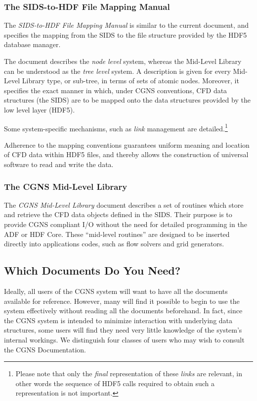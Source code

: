 \subsubsection{The SIDS-to-HDF File Mapping Manual}

The \textit{SIDS-to-HDF File Mapping Manual}
is similar to the current document, and specifies the mapping from the
SIDS to the file structure provided by the HDF5 database manager.

The document describes the \emph{node level} system, whereas the
Mid-Level Library can be understood as the \emph{tree level} system.
A description
is given for every Mid-Level Library type, or sub-tree, in terms of sets
of atomic nodes. Moreover, it specifies the exact manner in which, under
CGNS conventions, CFD data structures (the SIDS) are to be 
mapped onto the data structures provided by the low level layer
(HDF5).

Some system-specific mechanisms, such as \emph{link} management are
detailed.\footnote{Please note that only the \emph{final}
representation of these \emph{links} are relevant, in other words
the sequence of HDF5 calls required to obtain such a representation
is not important.}

Adherence to the mapping conventions guarantees uniform meaning
and location of CFD data within HDF5 files, and thereby allows the
construction of universal software to read and write the data.

\subsubsection{The CGNS Mid-Level Library}

The \textit{CGNS Mid-Level Library} document describes a set of routines
which store and retrieve the CFD data objects defined in the SIDS.
Their purpose is to provide CGNS compliant I/O without the need for
detailed programming in the ADF or HDF Core.
These ``mid-level routines'' are designed to be inserted directly into
applications codes, such as flow solvers and grid generators.

\subsection{Which Documents Do You Need?}

Ideally, all users of the CGNS system will want to have all the
documents available for reference. However, many will find it possible
to begin to use the system effectively without reading all the documents
beforehand.  In fact, since the CGNS system is intended to minimize
interaction with underlying data structures, some users will find
they need very little knowledge of the system's internal workings. We
distinguish four classes of users who may wish to consult the CGNS
Documentation.

